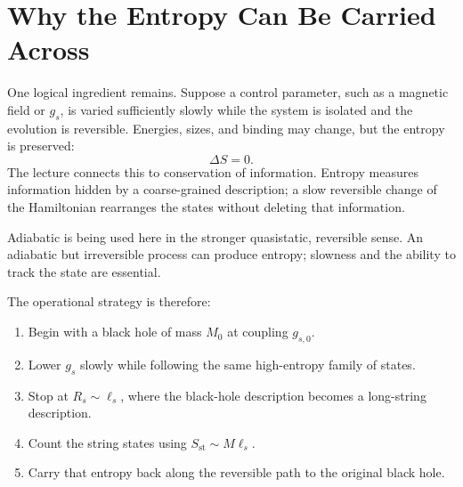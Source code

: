 \section{Why the Entropy Can Be Carried Across}

One logical ingredient remains. Suppose a control parameter, such as a magnetic field or \(g_s\), is varied sufficiently slowly while the system is isolated and the evolution is reversible. Energies, sizes, and binding may change, but the entropy is preserved:
\begin{equation}
\Delta S=0.
\label{eq:l06-adiabatic-entropy}
\end{equation}
The lecture connects this to conservation of information. Entropy measures information hidden by a coarse-grained description; a slow reversible change of the Hamiltonian rearranges the states without deleting that information.

\begin{classroomqa}
\end{classroomqa}

Adiabatic is being used here in the stronger quasistatic, reversible sense. An adiabatic but irreversible process can produce entropy; slowness and the ability to track the state are essential.

\begin{classroomqa}
\end{classroomqa}

The operational strategy is therefore:
\begin{enumerate}
\item Begin with a black hole of mass \(M_0\) at coupling \(g_{s,0}\).
\item Lower \(g_s\) slowly while following the same high-entropy family of states.
\item Stop at \(R_s\sim\ell_s\), where the black-hole description becomes a long-string description.
\item Count the string states using \(S_{\mathrm{st}}\sim M\ell_s\).
\item Carry that entropy back along the reversible path to the original black hole.
\end{enumerate}

